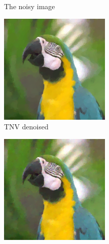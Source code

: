 \documentclass{article}
\begin{document}
\begin{figure}[ht]
\begin{subfigure}[b]{0.24\textwidth}
        \caption{The noisy image}
        \label{fig:noisy_colour}
    \end{subfigure}
    \vspace{.3cm}
    
    \begin{subfigure}[b]{0.24\textwidth}
        \centering
        \includegraphics[width=\textwidth]{images/TNVdenoised_colour.png}
        \caption{TNV denoised}
        \label{fig:TNVdenoised_colour}
    \end{subfigure}
    \begin{subfigure}[b]{0.24\textwidth}
        \centering
        \includegraphics[width=\textwidth]{images/FrobeniusNormdenoised_colour.png}

\end{subfigure}
\end{figure}
\end{document}
